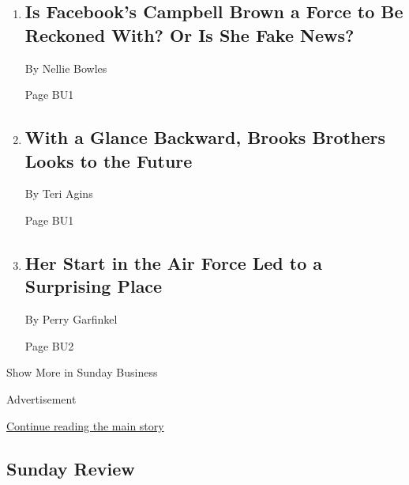 \begin{enumerate}
\def\labelenumi{\arabic{enumi}.}
\item
  \href{/2018/04/21/technology/facebook-campbell-brown-news.html}{}

  \hypertarget{is-facebooks-campbell-brown-a-force-to-be-reckoned-with-or-is-she-fake-news-1}{%
  \subsection{Is Facebook's Campbell Brown a Force to Be Reckoned With?
  Or Is She Fake
  News?}\label{is-facebooks-campbell-brown-a-force-to-be-reckoned-with-or-is-she-fake-news-1}}

  By Nellie Bowles

  Page BU1
\item
  \href{/2018/04/21/business/brooks-brothers-looks-to-the-future.html}{}

  \hypertarget{with-a-glance-backward-brooks-brothers-looks-to-the-future}{%
  \subsection{With a Glance Backward, Brooks Brothers Looks to the
  Future}\label{with-a-glance-backward-brooks-brothers-looks-to-the-future}}

  By Teri Agins

  Page BU1
\item
  \href{/2018/04/20/business/vocations-air-force.html}{}

  \hypertarget{her-start-in-the-air-force-led-to-a-surprising-place}{%
  \subsection{Her Start in the Air Force Led to a Surprising
  Place}\label{her-start-in-the-air-force-led-to-a-surprising-place}}

  By Perry Garfinkel

  Page BU2
\end{enumerate}

Show More in Sunday Business

Advertisement

\protect\hyperlink{after-mid4}{Continue reading the main story}

\hypertarget{sunday-review}{%
\subsection{Sunday Review}\label{sunday-review}}

